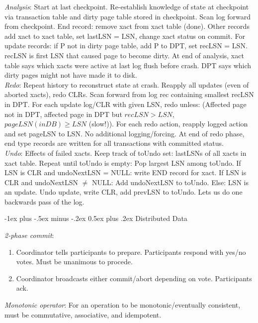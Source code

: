 \documentclass[10pt,landscape]{article}
\makeatletter
\renewcommand{\section}{\@startsection{section}{1}{0mm}%
                                {-1ex plus -.5ex minus -.2ex}%
                                {0.5ex plus .2ex}%
                                {\normalfont\large\bfseries}}
\makeatother
\begin{document}
\begin{multicols}{3}
\textit{Analysis}: Start at last checkpoint. Re-establish knowledge of state at checkpoint via transaction table and dirty page table stored in checkpoint. Scan log forward from checkpoint. End record: remove xact from xact table (done). Other records add xact to xact table, set lastLSN = LSN, change xact status on commit. For update records: if P not in dirty page table, add P to DPT, set recLSN = LSN. recLSN is first LSN that caused page to become dirty. At end of analysis, xact table says which xacts were active at last log flush before crash. DPT says which dirty pages might not have made it to disk. \\
\textit{Redo}: Repeat history to reconstruct state at crash. Reapply all updates (even of aborted xacts), redo CLRs. Scan forward from log rec containing smallest recLSN in DPT. For each update log/CLR with given LSN, redo unless: (Affected page not in DPT, affected page in DPT but $recLSN > LSN$, $pageLSN(inDB) \ge LSN$ (slow!)). For each redo action, reapply logged action and set pageLSN to LSN. No additional logging/forcing. At end of redo phase, end type records are written for all transactions with committed status. \\
\textit{Undo}: Effects of failed xacts. Keep track of toUndo set: lastLSNs of all xacts in xact table. Repeat until toUndo is empty: Pop largest LSN among toUndo. If LSN is CLR and undoNextLSN = NULL: write END record for xact. If LSN is CLR and undoNextLSN $\ne$ NULL: Add undoNextLSN to toUndo. Else: LSN is an update. Undo update, write CLR, add prevLSN to toUndo. Lets us do one backwards pass of the log.


\section{Distributed Data}

\textit{2-phase commit}:

\begin{enumerate}
  \item Coordinator tells participants to prepare. Participants respond with yes/no votes. Must be unanimous to procede.
  \item Coordinator broadcasts either commit/abort depending on vote. Participants ack.
\end{enumerate}

\textit{Monotonic operator}: For an operation to be monotonic/eventually consistent, must be commutative, associative, and idempotent.


\end{multicols}
\end{document}
